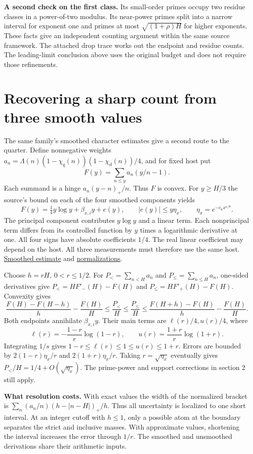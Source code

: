 \documentclass[12pt,letterpaper]{article}
\newcommand{\orig}[3]{\href{https://github.com/nousentllc/riemann-hypothesis/blob/40e56bab026552e089d7afcfeff08d2defb9c005/src/#1.lean\#L#2}{#3}}
\newcommand{\para}[1]{\par\medskip\noindent\textbf{#1}\quad}
\newcommand{\pagepart}[1]{\clearpage\section{#1}}
\begin{document}
\para{A second check on the first class.} Its small-order primes occupy two residue classes in a power-of-two modulus. Its near-power primes split into a narrow interval for exponent one and primes at most \(\sqrt{(1+\rho)H}\) for higher exponents. These facts give an independent counting argument within the same source framework. The attached drop trace works out the endpoint and residue counts. The leading-limit conclusion above uses the original budget and does not require those refinements.
\pagepart{Recovering a sharp count from three smooth values}
The same family's smoothed character estimates give a second route to the quarter. Define nonnegative weights \(a_n=\Lambda(n)(1-\chi_q(n))(1-\chi_d(n))/4\), and for fixed host put
\[
 F(y)=\sum_{n\le y}a_n(y/n-1).
\]
Each summand is a hinge \(a_n(y-n)_+/n\). Thus \(F\) is convex. For \(y\ge H/3\) the source's bound on each of the four smoothed components yields
\[
 F(y)=\tfrac14 y\log y+\beta_{x,i}y+e(y),\qquad
 |e(y)|\le y\eta_x,\qquad \eta_x=e^{-c_6x^{\varepsilon/8}}.
\]
The principal component contributes \(y\log y\) and a linear term. Each nonprincipal term differs from its controlled function by \(y\) times a logarithmic derivative at one. All four signs have absolute coefficients \(1/4\). The real linear coefficient may depend on the host. All three measurements must therefore use the same host. \orig{Development/AbelianVarietyTheory/Definitions/GlobalTwisting/ThinScalesIffHostBound}{61}{Smoothed estimate} and \orig{Formalism/SharpRestriction/GlobalSchurBounds/GeneralLinearActions/FiltrationCocycleLiftCriterion}{15}{normalizations}.

Choose \(h=rH,\ 0<r\le 1/2\). For \(P_{<}=\sum_{n<H}a_n\) and \(P_{\le}=\sum_{n\le H}a_n\), one-sided derivatives give \(P_{<}=HF'_-(H)-F(H)\) and \(P_{\le}=HF'_+(H)-F(H)\). Convexity gives
\[
 \frac{F(H)-F(H-h)}h-\frac{F(H)}H
 \le \frac{P_{<}}H\le\frac{P_{\le}}H
 \le \frac{F(H+h)-F(H)}h-\frac{F(H)}H .
\]
Both endpoints annihilate \(\beta_{x,i}y\). Their main terms are \(\ell(r)/4,u(r)/4\), where
\[
 \ell(r)=-\frac{1-r}{r}\log(1-r),\qquad
 u(r)=\frac{1+r}{r}\log(1+r).
\]
Integrating \(1/s\) gives \(1-r\le\ell(r)\le1\le u(r)\le1+r\). Errors are bounded by \(2(1-r)\eta_x/r\) and \(2(1+r)\eta_x/r\). Taking \(r=\sqrt{\eta_x}\) eventually gives \(P_{<}/H=1/4+O(\sqrt{\eta_x})\). The prime-power and support corrections in section 2 still apply.

\para{What resolution costs.} With exact values the width of the normalized bracket is \(\sum_n(a_n/n)(h-|n-H|)_+/h\). Thus all uncertainty is localized to one short interval. At an integer cutoff with \(h\le1\), only a possible atom at the boundary separates the strict and inclusive masses. With approximate values, shortening the interval increases the error through \(1/r\). The smoothed and unsmoothed derivations share their arithmetic inputs.
\end{document}
